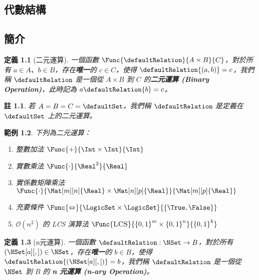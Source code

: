 \documentclass[12pt,a4paper,oneside]{report}
\begin{document}
\begin{CJK}{UTF8}{bkai}
\newtheorem{mydef}{定義}[chapter]
\newtheorem*{mydef*}{定義}
\newtheorem{myrule}[mydef]{原理}
\newtheorem{mythm}[mydef]{定理}
\newtheorem{mypropo}[mydef]{性質}
\newtheorem{mycorol}[mydef]{推論}
\newtheorem{myexample}[mydef]{範例}
\newtheorem*{mynote*}{註}
\renewenvironment{proof}{\textbf{證明}}{\qed}
\newenvironment{mysol}{\textbf{解答}}{\qed}


\fi

\chapter{代數結構}
\section{簡介}

\begin{mydef}[二元運算]
\label{def:algebra:binary_operation}
一個函數 $\Func{\defaultRelation}{A\times{B}}{C}$，對於所有 $a\in{A}$、$b\in{B}$，存在\textbf{唯一}的 $c\in{C}$，使得 $\defaultRelation{(a,b)}=c$，我們稱 $\defaultRelation$ 是一個從 $A\times{B}$ 到 $C$ 的\textbf{二元運算 (Binary Operation)}，此時記為 $a\defaultRelation{b}=c$。
\end{mydef}
\begin{mynote*}
若 $A=B=C=\defaultSet$，我們稱 $\defaultRelation$ 是定義在 $\defaultSet$ 上的二元運算。
\end{mynote*}

\begin{myexample}下列為二元運算：
\begin{enumerate}
\item 整數加法 $\Func{+}{\Int\times{\Int}}{\Int}$
\item 實數乘法 $\Func{\cdot}{\Real^2}{\Real}$
\item 實係數矩陣乘法 $\Func{\cdot}{\Mat[m][n]{\Real}\times\Mat[n][p]{\Real}}{\Mat[m][p]{\Real}}$
\item 充要條件 $\Func{\Leftrightarrow}{{\LogicSet}\times{\LogicSet}}{\left\{{\True,\False}\right\}}$
\item $\mathcal{O}{(n^2)}$ 的 LCS 演算法 $\Func{\textsc{LCS}}{{{\{0,1\}}^{m}}\times{{\{0,1\}}^{n}}}{{\{0,1\}}^{k}}$
\end{enumerate}
\end{myexample}

\begin{mydef}[n元運算]
\label{def:algebra:n_ary_operation}
一個函數 $\defaultRelation: \NSet\rightarrow{B}$，對於所有 ${\left({\NSet[a][,]}\right)}\in{\NSet}$，存在\textbf{唯一}的 $b\in{B}$，使得 $\defaultRelation{\left({\NSet[a][,]}\right)}=b$，我們稱 $\defaultRelation$ 是一個從 $\NSet$ 到 $B$ 的\textbf{ n 元運算 (n-ary Operation)}。
\end{mydef}


\end{CJK}
\end{document}
